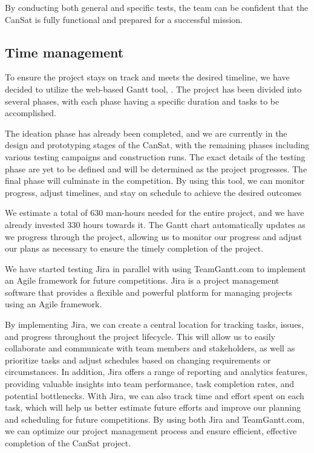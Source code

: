 \documentclass[11pt]{article}
\begin{document}
By conducting both general and specific tests, the team can be confident that the CanSat is fully functional and prepared for a successful mission.


\subsection{Time management}
To ensure the project stays on track and meets the desired timeline, we have decided to utilize the web-based Gantt tool, \href{https://app.teamgantt.com/}{\color{DeepSkyBlue4}{TeamGantt.com}}. The project has been divided into several phases, with each phase having a specific duration and tasks to be accomplished.

The ideation phase has already been completed, and we are currently in the design and prototyping stages of the CanSat, with the remaining phases including various testing campaigns and construction runs. The exact details of the testing phase are yet to be defined and will be determined as the project progresses. The final phase will culminate in the competition. By using this tool, we can monitor progress, adjust timelines, and stay on schedule to achieve the desired outcomes

We estimate a total of 630 man-hours needed for the entire project, and we have already invested 330 hours towards it. The Gantt chart automatically updates as we progress through the project, allowing us to monitor our progress and adjust our plans as necessary to ensure the timely completion of the project.

We have started testing Jira in parallel with using TeamGantt.com to implement an Agile framework for future competitions. Jira is a project management software that provides a flexible and powerful platform for managing projects using an Agile framework. 

By implementing Jira, we can create a central location for tracking tasks, issues, and progress throughout the project lifecycle. This will allow us to easily collaborate and communicate with team members and stakeholders, as well as prioritize tasks and adjust schedules based on changing requirements or circumstances. In addition, Jira offers a range of reporting and analytics features, providing valuable insights into team performance, task completion rates, and potential bottlenecks. With Jira, we can also track time and effort spent on each task, which will help us better estimate future efforts and improve our planning and scheduling for future competitions. By using both Jira and TeamGantt.com, we can optimize our project management process and ensure efficient, effective completion of the CanSat project.
\end{document}
